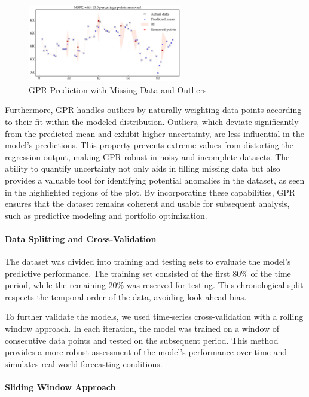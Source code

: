 \begin{figure}[htbp]
    \centering
    \includegraphics[width=0.6\textwidth]{figures/predicted_MSFT_with_removed.png}
    \caption{GPR Prediction with Missing Data and Outliers}
    \label{fig:gpr_missing_outliers}
\end{figure}

Furthermore, GPR handles outliers by naturally weighting data points according to their fit within the modeled distribution. Outliers, which deviate significantly from the predicted mean and exhibit higher uncertainty, are less influential in the model's predictions. This property prevents extreme values from distorting the regression output, making GPR robust in noisy and incomplete datasets. The ability to quantify uncertainty not only aids in filling missing data but also provides a valuable tool for identifying potential anomalies in the dataset, as seen in the highlighted regions of the plot. By incorporating these capabilities, GPR ensures that the dataset remains coherent and usable for subsequent analysis, such as predictive modeling and portfolio optimization.


\paragraph{Data Splitting and Cross-Validation}

The dataset was divided into training and testing sets to evaluate the model's predictive performance. The training set consisted of the first 80\% of the time period, while the remaining 20\% was reserved for testing. This chronological split respects the temporal order of the data, avoiding look-ahead bias.

To further validate the models, we used time-series cross-validation with a rolling window approach. In each iteration, the model was trained on a window of consecutive data points and tested on the subsequent period. This method provides a more robust assessment of the model's performance over time and simulates real-world forecasting conditions.

\paragraph{Sliding Window Approach}

